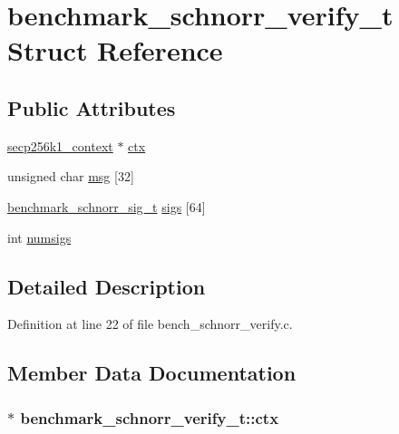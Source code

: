 \hypertarget{structbenchmark__schnorr__verify__t}{}\section{benchmark\+\_\+schnorr\+\_\+verify\+\_\+t Struct Reference}
\label{structbenchmark__schnorr__verify__t}
\subsection*{Public Attributes}
\begin{DoxyCompactItemize}
\item 
\hyperlink{secp256k1_8h_a282ec9e6dfec8c35955c3eb2f7476e5e}{secp256k1\+\_\+context} $\ast$ \hyperlink{structbenchmark__schnorr__verify__t_add37fb6de4d6b469d94b83b5b76a0a18}{ctx}
\item 
unsigned char \hyperlink{structbenchmark__schnorr__verify__t_a5230ec380d2ccfe3061b6b5f431cd466}{msg} \mbox{[}32\mbox{]}
\item 
\hyperlink{structbenchmark__schnorr__sig__t}{benchmark\+\_\+schnorr\+\_\+sig\+\_\+t} \hyperlink{structbenchmark__schnorr__verify__t_a2ae41817934debad3a4f17f101eee0a1}{sigs} \mbox{[}64\mbox{]}
\item 
int \hyperlink{structbenchmark__schnorr__verify__t_af57633e576212bd6fe660a7722c1228f}{numsigs}
\end{DoxyCompactItemize}


\subsection{Detailed Description}


Definition at line 22 of file bench\+\_\+schnorr\+\_\+verify.\+c.



\subsection{Member Data Documentation}
\hypertarget{structbenchmark__schnorr__verify__t_add37fb6de4d6b469d94b83b5b76a0a18}{}
\subsubsection[{ctx}]{$\ast$ benchmark\+\_\+schnorr\+\_\+verify\+\_\+t\+::ctx}\label{structbenchmark__schnorr__verify__t_add37fb6de4d6b469d94b83b5b76a0a18}


